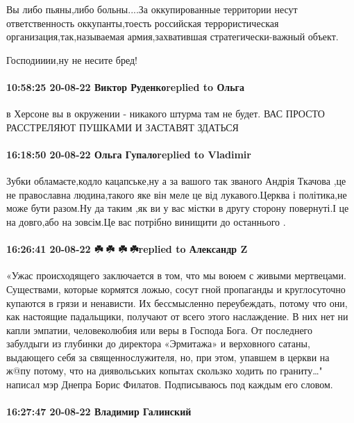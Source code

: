 Вы либо пьяны,либо больны....За оккупированные территории несут ответственность
оккупанты,тоесть российская террористическая организация,так,называемая
армия,захватившая стратегически-важный объект.

Господииии,ну не несите бред!

\paragraph{10:58:25 20-08-22 Виктор Руденкоreplied to Ольга}

в Херсоне вы в окружении - никакого штурма там не будет.
ВАС ПРОСТО РАССТРЕЛЯЮТ ПУШКАМИ И ЗАСТАВЯТ ЗДАТЬСЯ

\paragraph{16:18:50 20-08-22 Ольга Гупалоreplied to Vladimir}

Зубки обламаєте,кодло кацапське,ну а за вашого так званого Андрія Ткачова ,це
не православна людина,такого яке він меле це від лукавого.Церква і політика,не
може бути разом.Ну да таким ,як ви у вас містки в другу сторону повернуті.І це
на довго,або на зовсім.Це вас потрібно винищити до останнього .

\paragraph{16:26:41 20-08-22 ☘️🌻☘️ ☘️🌻☘️replied to Александр Z}

«Ужас происходящего заключается в том, что мы воюем с живыми мертвецами.
Существами, которые кормятся ложью, сосут гной пропаганды и круглосуточно
купаются в грязи и ненависти. Их бессмысленно переубеждать, потому что они, как
настоящие падальщики, получают от всего этого наслаждение. В них нет ни капли
эмпатии, человеколюбия или веры в Господа Бога. От последнего забулдыги из
глубинки до директора «Эрмитажа» и верховного сатаны, выдающего себя за
священнослужителя, но, при этом, упавшем в церкви на ж@пу потому, что на
диявольських копытах скользко ходить по граниту…" написал мэр Днепра Борис
Филатов.
Подписываюсь под каждым его словом.

\paragraph{16:27:47 20-08-22 Владимир Галинский}

